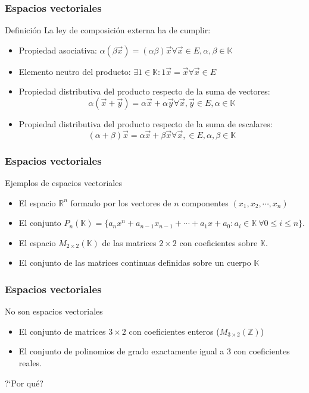 \documentclass{beamer}
\begin{document}
\begin{frame}
  \frametitle{Espacios vectoriales}
  \begin{block}{Definici\'on}
La ley de composici\'on externa ha de cumplir:
\begin{itemize}
\item Propiedad asociativa:
$ \alpha(\beta \vec x) = (\alpha \beta) \vec x \forall \vec x \in E, \alpha,\beta\in \mathbb K $
\item Elemento neutro del producto:
$\exists 1 \in \mathbb K: 1 \vec x  = \vec x \forall \vec x \in E $
\item Propiedad distributiva del producto respecto de la suma de vectores:
\[\alpha( \vec x+\vec y) = \alpha\vec x+\alpha \vec y \forall \vec x, \vec y \in E, \alpha\in \mathbb K\]
\item Propiedad distributiva del producto respecto de la suma de escalares:
\[(\alpha+\beta)\vec x = \alpha\vec x+\beta \vec x \forall \vec x, \in E, \alpha,\beta\in \mathbb K\]
\end{itemize}
\end{block}
  \end{frame}

\begin{frame}
  \frametitle{Espacios vectoriales}
  \begin{block}{Ejemplos de espacios vectoriales}
\begin{itemize}
\item El espacio $\mathbb R^n$ formado por los vectores de $n$ componentes $(x_1,x_2,\cdots,x_n)$
\item El conjunto $P_n(\mathbb K) = \{a_nx^n+a_{n-1}x_{n-1}+\cdots+a_1x+a_0:a_i\in \mathbb K\ \forall 0\leq i \leq n\}$.
\item El espacio $M_{2\times 2} (\mathbb K) $ de las matrices $2\times 2$ con coeficientes sobre $\mathbb K$.
\item El conjunto de las matrices continuas definidas sobre un cuerpo $\mathbb K$
\end{itemize}
\end{block}
  \end{frame}
  
  \begin{frame}
  \frametitle{Espacios vectoriales}
  \begin{block}{No son espacios vectoriales}
\begin{itemize}
\item El conjunto de matrices $3\times 2$ con coeficientes enteros ($M_{3\times 2} (\mathbb Z) $)
\item El conjunto de polinomios de grado exactamente igual a 3 con coeficientes reales.
\end{itemize}
?`Por qu\'e?
\end{block}
  \end{frame}
\end{document}
